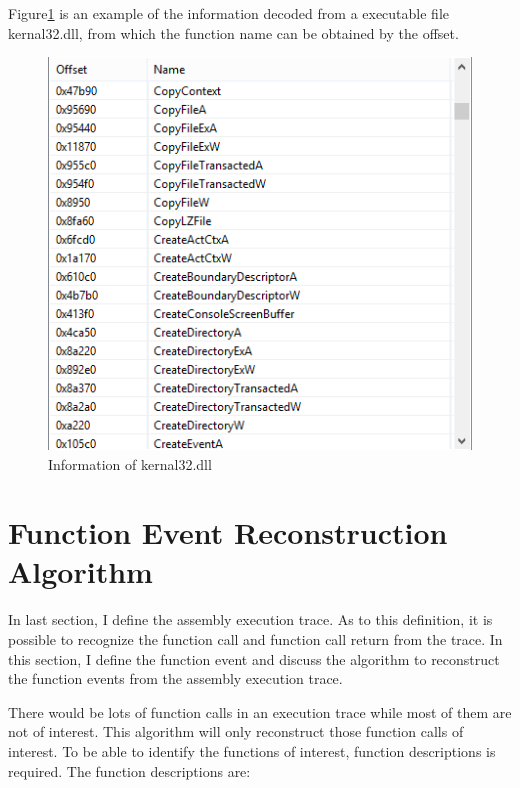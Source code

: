 Figure\ref{executable} is an example of the information decoded from a executable file kernal32.dll, from which the function name can be obtained by the offset.

\begin{figure}[H]
\centerline{\includegraphics{Figures/executable}}
\caption{Information of kernal32.dll}
\label{executable}
\end{figure}

\section{Function Event Reconstruction Algorithm}
In last section, I define the assembly execution trace. As to this definition, it is possible to recognize the function call and function call return from the trace.  In this section, I define the function event and discuss the algorithm to reconstruct the function events from the assembly execution trace. 


There would be lots of function calls in an execution trace while most of them are not of interest. This algorithm will only reconstruct those function calls of interest. To be able to identify the functions of interest, function descriptions is required. The function descriptions are:

